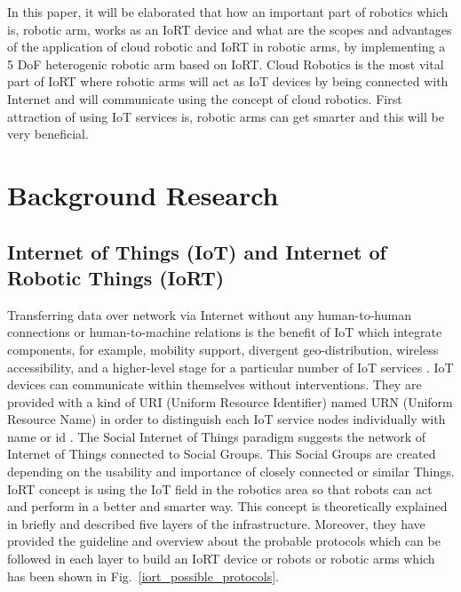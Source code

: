 \documentclass[conference]{IEEEtran}
\begin{document}
In this paper, it will be elaborated that how an important part of robotics which is, robotic arm, works as an IoRT device and what are the scopes and advantages of the application of cloud robotic and IoRT in robotic arms, by implementing a 5 DoF heterogenic robotic arm based on IoRT. Cloud Robotics is the most vital part of IoRT where robotic arms will act as IoT devices by being connected with Internet and will communicate using the concept of cloud robotics. First attraction of using IoT services is, robotic arms can get smarter and this will be very beneficial.




\section{Background Research}

\subsection{Internet of Things (IoT) and Internet of Robotic Things (IoRT)}

Transferring data over network via Internet without any human-to-human connections or human-to-machine relations is the benefit of IoT which integrate components, for example, mobility support, divergent geo-distribution, wireless accessibility, and a higher-level stage for a particular number of IoT services \cite{seven}. IoT devices can communicate within themselves without interventions. They are provided with a kind of URI (Uniform Resource Identifier) named URN (Uniform Resource Name) in order to distinguish each IoT service nodes individually with name or id \cite{eight}. The Social Internet of Things paradigm suggests the network of Internet of Things connected to Social Groups. This Social Groups are created depending on the usability and importance of closely connected or similar Things.
IoRT concept is using the IoT field in the robotics area so that robots can act and perform in a better and smarter way. This concept is theoretically explained in \cite{nine} briefly and described five layers of the infrastructure. Moreover, they have provided the guideline and overview about the probable protocols which can be followed in each layer to build an IoRT device or robots or robotic arms which has been shown in Fig.~\ref{iort_possible_protocols}.
\end{document}
